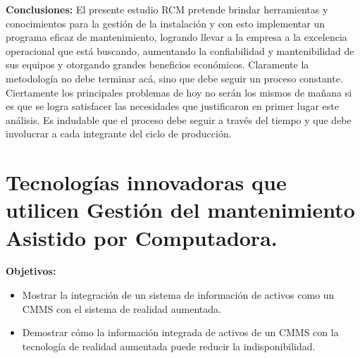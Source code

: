 \begin{description}
\item \textbf{Conclusiones:} El presente estudio RCM pretende brindar herramientas y conocimientos para la gestión de la instalación y con esto implementar un programa eficaz de mantenimiento, logrando llevar a la empresa a la excelencia operacional que está buscando, aumentando la confiabilidad y mantenibilidad de sus equipos y otorgando grandes beneficios económicos. 
Claramente la metodología no debe terminar acá, sino que debe seguir un proceso constante. Ciertamente los principales problemas de hoy no serán los mismos de mañana si es que se logra satisfacer las necesidades que justificaron en primer lugar este análisis. Es indudable que el proceso debe seguir a través del tiempo y que debe involucrar a cada integrante del ciclo de producción. 
\end{description}




\section{Tecnologías innovadoras que utilicen Gestión del mantenimiento Asistido por Computadora.}



\begin{description}
\item \textbf{Objetivos:}
\begin{itemize}
\item Mostrar la integración de un sistema de información de activos como un CMMS con el sistema de realidad aumentada.
\item Demostrar cómo la información integrada de activos de un CMMS con la tecnología de realidad aumentada puede reducir la indisponibilidad.
\end{itemize}
\end{description}

